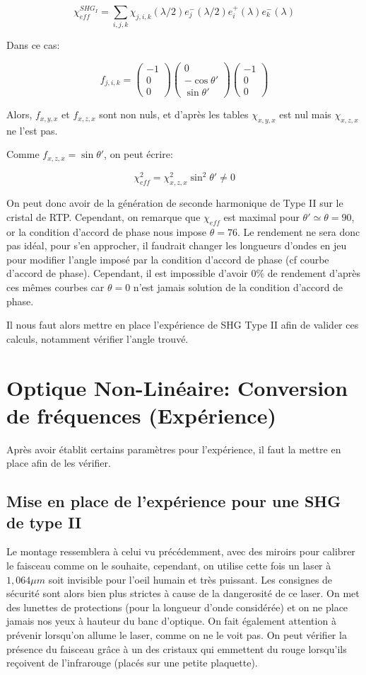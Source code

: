 \documentclass[a4paper,11pt]{report}
\begin{document}
\[\chi_{eff}^{SHG_I}=\sum_{i,j,k}\chi_{j,i,k}(\lambda/2)e^-_j(\lambda/2)e^+_i(\lambda)e^-_k(\lambda)\]

Dans ce cas:

\[f_{j,i,k}=\begin{pmatrix}-1\\0\\0\end{pmatrix}\begin{pmatrix}0\\-\cos\theta'\\\sin\theta'\end{pmatrix}\begin{pmatrix}-1\\0\\0\end{pmatrix}\]

Alors, $f_{x,y,x}$ et $f_{x,z,x}$ sont non nuls, et d'après les tables $\chi_{x,y,x}$ est nul mais $\chi_{x,z,x}$ ne l'est pas. 

Comme $f_{x,z,x}=\sin\theta'$, on peut écrire:

\[\chi_{eff}^2=\chi_{x,z,x}^2\sin^2\theta'\neq 0\]

On peut donc avoir de la génération de seconde harmonique de Type II sur le cristal de RTP. Cependant, on remarque que $\chi_{eff}$ est maximal pour $\theta'\simeq\theta=90$\textdegree, or la condition d'accord de phase nous impose $\theta=76$\textdegree. Le rendement ne sera donc pas idéal, pour s'en approcher, il faudrait changer les longueurs d'ondes en jeu pour modifier l'angle imposé par la condition d'accord de phase (cf courbe d'accord de phase). Cependant, il est impossible d'avoir 0\% de rendement d'après ces mêmes courbes car $\theta=0$ n'est jamais solution de la condition d'accord de phase.

Il nous faut alors mettre en place l'expérience de SHG Type II afin de valider ces calculs, notamment vérifier l'angle trouvé.

\chapter{Optique Non-Linéaire: Conversion de fréquences (Expérience)} \label{ONLExp}
Après avoir établit certains paramètres pour l'expérience, il faut la mettre en place afin de les vérifier.
\section{Mise en place de l'expérience pour une SHG de type II}
Le montage ressemblera à celui vu précédemment, avec des miroirs pour calibrer le faisceau comme on le souhaite, cependant, on utilise cette fois un laser à $1,064\mu m$ soit invisible pour l'oeil humain et très puissant. Les consignes de sécurité sont alors bien plus strictes à cause de la dangerosité de ce laser. On met des lunettes de protections (pour la longueur d'onde considérée) et on ne place jamais nos yeux à hauteur du banc d'optique. On fait également attention à prévenir lorsqu'on allume le laser, comme on ne le voit pas. On peut vérifier la présence du faisceau grâce à un des cristaux qui emmettent du rouge lorsqu'ils reçoivent de l'infrarouge (placés sur une petite plaquette).
\end{document}
